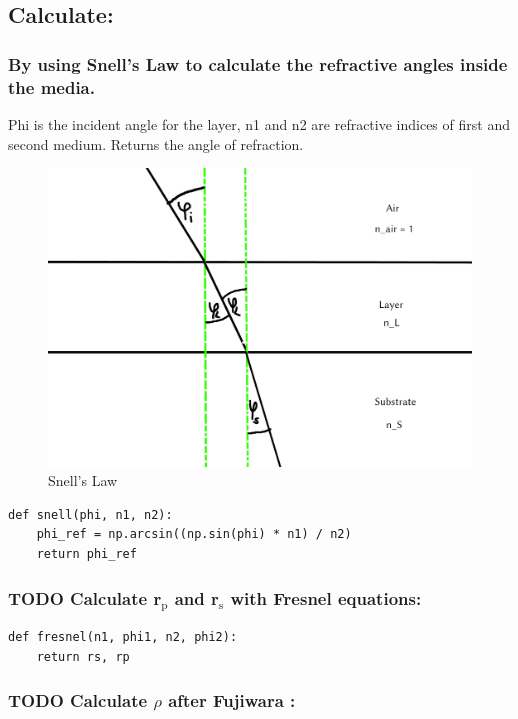 \documentclass[11pt]{article}
\begin{document}
\subsection{Calculate:}
\label{sec:org475c76a}
\subsubsection{By using Snell's Law to calculate the refractive angles inside the media.}
\label{sec:org464757d}
Phi is the incident angle for the layer, n1 and n2 are refractive indices of first and second medium. Returns the angle of refraction.

\begin{figure}[htbp]
\centering
\includegraphics[width=500]{./snell.jpg}
\caption{\label{fig:orgad8beb4}
Snell's Law}
\end{figure}
\begin{verbatim}
def snell(phi, n1, n2):
    phi_ref = np.arcsin((np.sin(phi) * n1) / n2)
    return phi_ref
\end{verbatim}


\subsubsection{{\bfseries\sffamily TODO} Calculate r\(_{\text{p}}\) and r\(_{\text{s}}\) with Fresnel equations:}
\label{sec:orga262a86}
\begin{verbatim}
def fresnel(n1, phi1, n2, phi2):
    return rs, rp
\end{verbatim}

\subsubsection{{\bfseries\sffamily TODO} Calculate \(\rho\) after Fujiwara \cite{fujiwara2009spectroscopic}:}
\label{sec:orgdfd9357}
\end{document}
